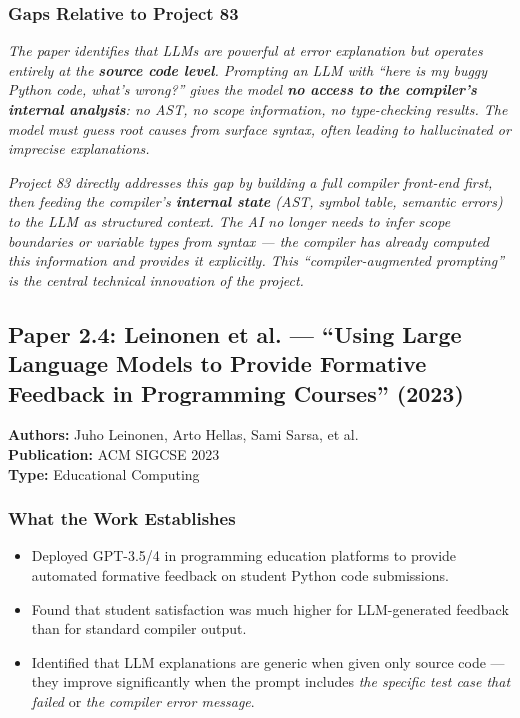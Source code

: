\documentclass[a4paper,11pt]{article}
\newcommand{\papergap}[1]{%
  \begin{tcolorbox}[colback=red!5!white, colframe=red!60!black, title={Research Gap Identified}]
  \textit{#1}
  \end{tcolorbox}
}
\newcommand{\oursolution}[1]{%
  \begin{tcolorbox}[colback=green!5!white, colframe=green!60!black, title={How Project 83 Solves This Gap}]
  \textit{#1}
  \end{tcolorbox}
}
\begin{document}
\subsubsection{Gaps Relative to Project 83}

\papergap{The paper identifies that LLMs are powerful at error explanation but operates entirely at the \textbf{source code level}. Prompting an LLM with ``here is my buggy Python code, what's wrong?'' gives the model \textbf{no access to the compiler's internal analysis}: no AST, no scope information, no type-checking results. The model must guess root causes from surface syntax, often leading to hallucinated or imprecise explanations.}

\oursolution{Project 83 directly addresses this gap by building a full compiler front-end \textit{first}, then feeding the compiler's \textbf{internal state} (AST, symbol table, semantic errors) to the LLM as structured context. The AI no longer needs to infer scope boundaries or variable types from syntax --- the compiler has already computed this information and provides it explicitly. This ``compiler-augmented prompting'' is the central technical innovation of the project.}

\subsection{Paper 2.4: Leinonen et al. --- ``Using Large Language Models to Provide Formative Feedback in Programming Courses'' (2023)}

\begin{tcolorbox}[colback=gray!5, colframe=gray!40]
\textbf{Authors:} Juho Leinonen, Arto Hellas, Sami Sarsa, et al. \\
\textbf{Publication:} ACM SIGCSE 2023 \\
\textbf{Type:} Educational Computing
\end{tcolorbox}

\subsubsection{What the Work Establishes}

\begin{itemize}
    \item Deployed GPT-3.5/4 in programming education platforms to provide automated formative feedback on student Python code submissions.
    \item Found that student satisfaction was much higher for LLM-generated feedback than for standard compiler output.
    \item Identified that LLM explanations are generic when given only source code --- they improve significantly when the prompt includes \textit{the specific test case that failed} or \textit{the compiler error message}.
\end{itemize}
\end{document}
